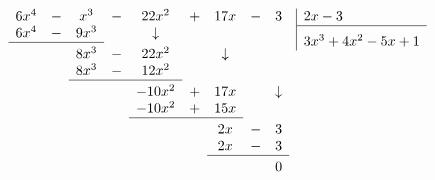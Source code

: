 \documentclass{article}
\begin{document}
\setlength{\arraycolsep}{2pt}
\renewcommand{\arraystretch}{1.1}

\[
\begin{array}[t]{ccccccccc}
  6x^4 & - & x^3  & - & 22x^2 & + & 17x & - & 3 \\

  6x^4 & - & 9x^3 &   & \downarrow & & & & \\

  \cline{1-3}
  \noalign{\vskip 3pt}

       &   & 8x^3  & - & 22x^2 &   & \downarrow & & \\

       &   & 8x^3  & - & 12x^2 &   &             & & \\

  \cline{3-5}
  \noalign{\vskip 3pt}

       &   &       &   & -10x^2 & + & 17x &   & \downarrow \\

       &   &       &   & -10x^2 & + & 15x &   & \\

  \cline{5-7}
  \noalign{\vskip 3pt}

       &   &       &   &        &   & 2x & - & 3 \\

       &   &       &   &        &   & 2x & - & 3 \\

  \cline{7-9}
  \noalign{\vskip 3pt}

       &   &       &   &        &   &    &   & 0
\end{array}
\enskip
\begin{array}[t]{|@{\enskip}l}
  2x-3 \\
  \hline
  \rule{0pt}{14pt}3x^3+4x^2-5x+1
\end{array}
\]
\end{document}
